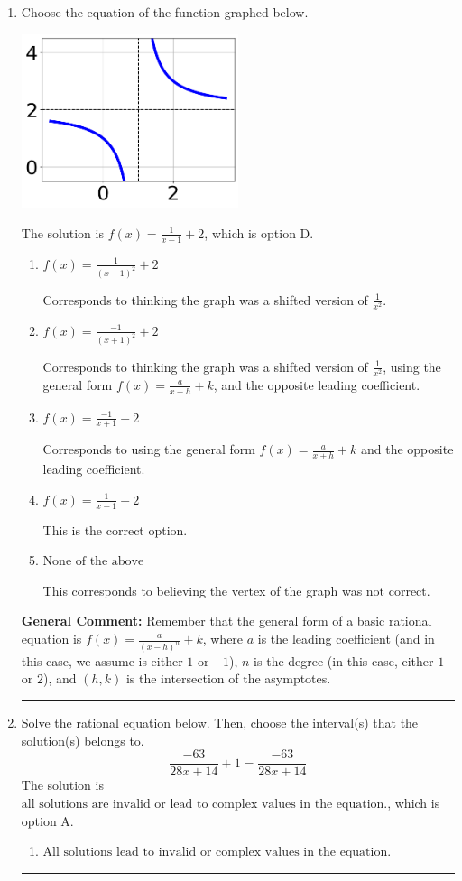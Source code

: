 \documentclass{extbook}[14pt]
\newcommand{\litem}[1]{\item #1

\rule{\textwidth}{0.4pt}}
\begin{document}
\begin{enumerate}\litem{
Choose the equation of the function graphed below.

\begin{center}
    \includegraphics[width=0.5\textwidth]{../Figures/rationalGraphToEquationA.png}
\end{center}



The solution is \( f(x) = \frac{1}{x - 1} + 2 \), which is option D.\begin{enumerate}[label=\Alph*.]
\item \( f(x) = \frac{1}{(x - 1)^2} + 2 \)

Corresponds to thinking the graph was a shifted version of $\frac{1}{x^2}$.
\item \( f(x) = \frac{-1}{(x + 1)^2} + 2 \)

Corresponds to thinking the graph was a shifted version of $\frac{1}{x^2}$, using the general form $f(x) = \frac{a}{x+h}+k$, and the opposite leading coefficient.
\item \( f(x) = \frac{-1}{x + 1} + 2 \)

Corresponds to using the general form $f(x) = \frac{a}{x+h}+k$ and the opposite leading coefficient.
\item \( f(x) = \frac{1}{x - 1} + 2 \)

This is the correct option.
\item \( \text{None of the above} \)

This corresponds to believing the vertex of the graph was not correct.
\end{enumerate}

\textbf{General Comment:} Remember that the general form of a basic rational equation is $ f(x) = \frac{a}{(x-h)^n} + k$, where $a$ is the leading coefficient (and in this case, we assume is either $1$ or $-1$), $n$ is the degree (in this case, either $1$ or $2$), and $(h, k)$ is the intersection of the asymptotes.
}
\litem{
Solve the rational equation below. Then, choose the interval(s) that the solution(s) belongs to.
\[ \frac{-63}{28x + 14} + 1 = \frac{-63}{28x + 14} \]
The solution is \( \text{all solutions are invalid or lead to complex values in the equation.} \), which is option A.\begin{enumerate}[label=\Alph*.]
\item \( \text{All solutions lead to invalid or complex values in the equation.} \)


\end{enumerate}}
\end{enumerate}
\end{document}
